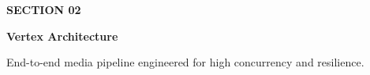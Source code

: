 \documentclass[aspectratio=169,11pt]{beamer}
\begin{document}
{
\begin{frame}[plain]
  \vspace*{36pt}
  \begin{minipage}{0.85\textwidth}
    {\color{accentcyan}\large\bfseries\faServer\quad SECTION 02} \par
    \vspace{12pt}
    {\fontsize{26pt}{32pt}\selectfont \color{white}\bfseries Vertex Architecture} \par
    \vspace{8pt}
    {\fontsize{14pt}{18pt}\selectfont \color{textlight} End-to-end media pipeline engineered for high concurrency and resilience.}
  \end{minipage}
  \vspace*{24pt}
\end{frame}
}
\end{document}
